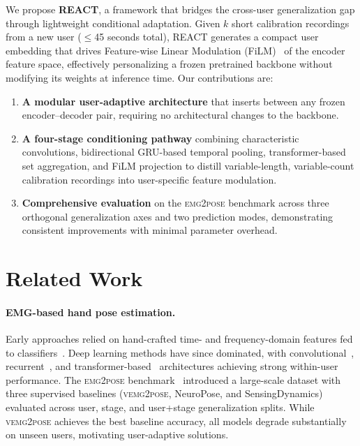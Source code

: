 \documentclass[10pt]{article}
\begin{document}
We propose \textbf{REACT}, a framework that bridges the cross-user generalization gap through lightweight conditional adaptation. Given $k$ short calibration recordings from a new user ($\leq$45 seconds total), REACT generates a compact user embedding that drives Feature-wise Linear Modulation (FiLM)~\citep{perez2018film} of the encoder feature space, effectively personalizing a frozen pretrained backbone without modifying its weights at inference time. Our contributions are:

\begin{enumerate}[leftmargin=*,itemsep=2pt,topsep=2pt]
    \item \textbf{A modular user-adaptive architecture} that inserts between any frozen encoder--decoder pair, requiring no architectural changes to the backbone.
    \item \textbf{A four-stage conditioning pathway} combining characteristic convolutions, bidirectional GRU-based temporal pooling, transformer-based set aggregation, and FiLM projection to distill variable-length, variable-count calibration recordings into user-specific feature modulation.
    \item \textbf{Comprehensive evaluation} on the \textsc{emg2pose} benchmark across three orthogonal generalization axes and two prediction modes, demonstrating consistent improvements with minimal parameter overhead.
\end{enumerate}

\section{Related Work}
\label{sec:related}

\paragraph{EMG-based hand pose estimation.}
Early approaches relied on hand-crafted time- and frequency-domain features fed to classifiers~\citep{phinyomark2012feature, atzori2016electromyography}. Deep learning methods have since dominated, with convolutional~\citep{atzori2016deep}, recurrent~\citep{ctrlabs2024generic}, and transformer-based~\citep{rahimian2021fs} architectures achieving strong within-user performance. The \textsc{emg2pose} benchmark~\citep{salter2024emg2pose} introduced a large-scale dataset with three supervised baselines (\textsc{vemg2pose}, NeuroPose, and SensingDynamics) evaluated across user, stage, and user+stage generalization splits. While \textsc{vemg2pose} achieves the best baseline accuracy, all models degrade substantially on unseen users, motivating user-adaptive solutions.
\end{document}
